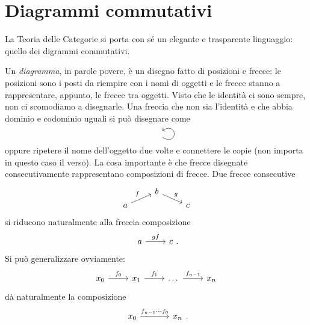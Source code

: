 
\section{Diagrammi commutativi}


La Teoria delle Categorie si porta con sé un elegante e trasparente linguaggio: quello dei digrammi commutativi. 

Un {\em diagramma}, in parole povere, è un disegno fatto di posizioni e frecce: le posizioni sono i posti da riempire con i nomi di oggetti e le frecce stanno a rappresentare, appunto, le frecce tra oggetti. Visto che le identità ci sono sempre, non ci scomodiamo a disegnarle. Una freccia che non sia l'identità e che abbia dominio e codominio uguali si può disegnare come
\[\begin{tikzcd}
\phantom\bullet \ar[out=-30,in=30,loop,looseness=7,overlay]
\end{tikzcd}\]
oppure ripetere il nome dell'oggetto due volte e connettere le copie (non importa in questo caso il verso). La cosa importante è che frecce disegnate consecutivamente rappresentano composizioni di frecce. Due frecce consecutive
\[\begin{tikzcd}[row sep=tiny]
              & b \ar["g",dr] &   \\
a \ar["f",ur] &               & c
\end{tikzcd}\]
si riducono naturalmente alla freccia composizione
\[\begin{tikzcd}
a \ar["gf",r] & c
\end{tikzcd}.\]
Si può generalizzare ovviamente:
\[\begin{tikzcd}
x_0 \ar["f_0",r] & x_1 \ar["f_1",r] & \dots{} \ar["f_{n-1}",r] & x_n
\end{tikzcd}\]
dà naturalmente la composizione
\[\begin{tikzcd}[column sep=1.2cm]
x_0 \ar["{f_{n-1}\cdots f_0}", r] & x_n
\end{tikzcd}.\]

